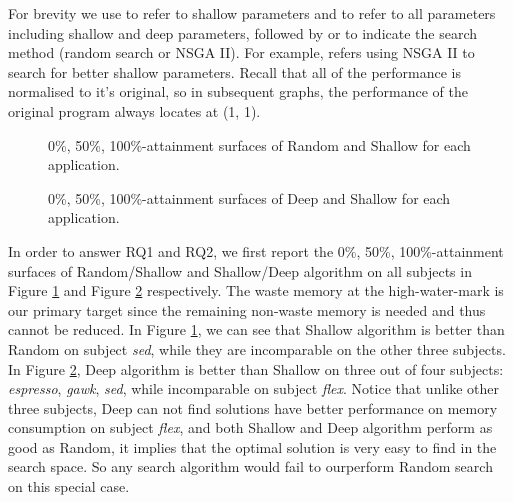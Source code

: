 For brevity we use \emph{\shallow} to refer to shallow parameters and \emph{\all} to refer to all parameters including shallow and deep parameters, followed by \emph{\randomsearch} or \emph{\nsgaii} to indicate the search method (random search or NSGA II). For example, \sn refers using NSGA II to search for better shallow parameters. Recall that all of the performance is normalised to it's original, so in subsequent graphs, the performance of the original program always locates at (1, 1). 

\begin{figure}[htbp]
	\centering
	\subfigure[espresso]{
		\label{fig_shallow_random_espresso}
		\texttt{[image: tba]}%
	}
	\subfigure[gawk]{
		\label{fig_shallow_random_gawk}
		\texttt{[image: tba]}%
	}
	\subfigure[flex]{
		\label{fig_shallow_random_flex}
		\texttt{[image: tba]}%
	}
	\subfigure[sed]{
		\label{fig_shallow_random_sed}
		\texttt{[image: tba]}%
	}
	\caption{0\%, 50\%, 100\%-attainment surfaces of Random and Shallow for each application.}\label{fig_shallow_random}
\end{figure}

\begin{figure}[htbp]
	\centering
	\subfigure[espresso]{
		\label{fig_deep_shallow_espresso}
		\texttt{[image: tba]}%
	}
	\subfigure[gawk]{
		\label{fig_deep_shallow_gawk}
		\texttt{[image: tba]}%
	}
	\subfigure[flex]{
		\label{fig_deep_shallow_flex}
		\texttt{[image: tba]}%
	}
	\subfigure[sed]{
		\label{fig_deep_shallow_sed}
		\texttt{[image: tba]}%
	}
	\caption{0\%, 50\%, 100\%-attainment surfaces of Deep and Shallow for each application.}\label{fig_deep_shallow}
\end{figure}

In order to answer RQ1 and RQ2, we first report the 0\%, 50\%, 100\%-attainment surfaces of Random/Shallow and Shallow/Deep algorithm on all subjects in Figure \ref{fig_shallow_random} and Figure \ref{fig_deep_shallow} respectively. The waste memory at the high-water-mark is our primary target since the remaining non-waste memory is needed and thus cannot be reduced. In Figure \ref{fig_shallow_random}, we can see that Shallow algorithm is better than Random on subject \emph{sed}, while they are incomparable on the other three subjects. In Figure \ref{fig_deep_shallow}, Deep algorithm is better than Shallow on three out of four subjects: \emph{espresso}, \emph{gawk}, \emph{sed}, while incomparable on subject \emph{flex}. Notice that unlike other three subjects, Deep can not find solutions have better performance on memory consumption on subject \emph{flex}, and both Shallow and Deep algorithm perform as good as Random, it implies that the optimal solution is very easy to find in the search space. So any search algorithm would fail to ourperform Random search on this special case.


